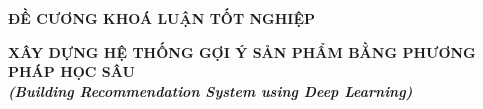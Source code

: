\documentclass{article}[14pt]
\begin{document}
    \begin{figure}[h]
        \begin{floatrow}
        {%
    
        }
        {%
    
        }
        \end{floatrow}
    \end{figure}
    
    \begin{center}
        
        \textbf{\Large ĐỀ CƯƠNG KHOÁ LUẬN TỐT NGHIỆP} \\ 
    \end{center}
    
    
    \begin{center}
        
        \textbf{\huge  XÂY DỰNG HỆ THỐNG GỢI Ý SẢN PHẨM BẰNG PHƯƠNG PHÁP HỌC 
SÂU} \\
        
    \vspace{.5cm}
        \textit{\textbf{\Large (Building Recommendation System using Deep 
Learning)}}
    \end{center}
    
\end{document}
